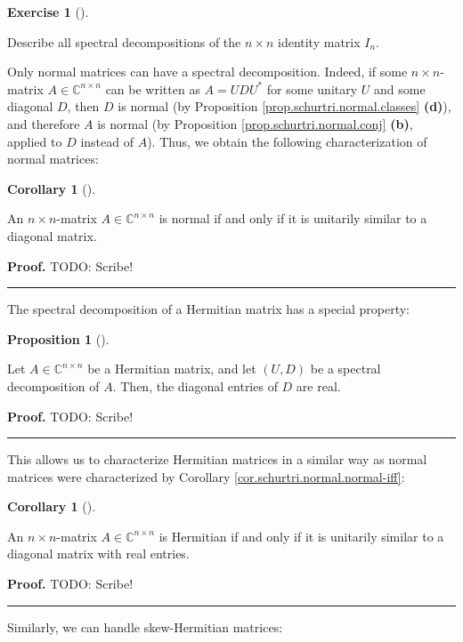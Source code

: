 \documentclass[numbers=enddot,12pt,final,onecolumn,notitlepage]{scrartcl}%
\newcounter{exer}
\numberwithin{exer}{subsection}
\theoremstyle{definition}
\newtheorem{prop}[theo]{Proposition}
\newenvironment{proposition}[1][]
{\begin{prop}[#1]\begin{leftbar}}
{\end{leftbar}\end{prop}}
\newtheorem{coro}[theo]{Corollary}
\newenvironment{corollary}[1][]
{\begin{coro}[#1]\begin{leftbar}}
{\end{leftbar}\end{coro}}
\newtheorem{exmp}[exer]{Exercise}
\newenvironment{exercise}[1][]
{\begin{exmp}[#1]\begin{leftbar}}
{\end{leftbar}\end{exmp}}
\newenvironment{proof}[1][Proof]{\noindent\textbf{#1.} }{\ \rule{0.5em}{0.5em}}
\begin{document}
\begin{exercise}
 Describe all spectral decompositions of the $n\times n$ identity
matrix $I_{n}$.
\end{exercise}

Only normal matrices can have a spectral decomposition. Indeed, if some
$n\times n$-matrix $A\in\mathbb{C}^{n\times n}$ can be written as
$A=UDU^{\ast}$ for some unitary $U$ and some diagonal $D$, then $D$ is normal
(by Proposition \ref{prop.schurtri.normal.classes} \textbf{(d)}), and
therefore $A$ is normal (by Proposition \ref{prop.schurtri.normal.conj}
\textbf{(b)}, applied to $D$ instead of $A$). Thus, we obtain the following
characterization of normal matrices:

\begin{corollary}
\label{cor.schurtri.normal.normal-iff}An $n\times n$-matrix $A\in
\mathbb{C}^{n\times n}$ is normal if and only if it is unitarily similar to a
diagonal matrix.
\end{corollary}

\begin{proof}
TODO: Scribe!
\end{proof}

The spectral decomposition of a Hermitian matrix has a special property:

\begin{proposition}
\label{prop.schurtri.normal.hermitian-spec}Let $A\in\mathbb{C}^{n\times n}$ be
a Hermitian matrix, and let $\left(  U,D\right)  $ be a spectral decomposition
of $A$. Then, the diagonal entries of $D$ are real.
\end{proposition}

\begin{proof}
TODO: Scribe!
\end{proof}

This allows us to characterize Hermitian matrices in a similar way as normal
matrices were characterized by Corollary \ref{cor.schurtri.normal.normal-iff}:

\begin{corollary}
\label{cor.schurtri.normal.hermitian-iff}An $n\times n$-matrix $A\in
\mathbb{C}^{n\times n}$ is Hermitian if and only if it is unitarily similar to
a diagonal matrix with real entries.
\end{corollary}

\begin{proof}
TODO: Scribe!
\end{proof}

Similarly, we can handle skew-Hermitian matrices:
\end{document}
